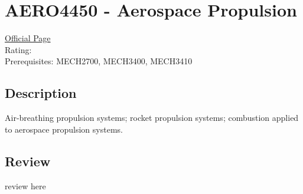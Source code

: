 \hypertarget{AERO4450}{\section{AERO4450 - Aerospace Propulsion}}

\large
\textcolor{turbo_purple}{\href{https://my.uq.edu.au/programs-courses/course.html?course_code=AERO4450}{Official Page}} \\
Rating: \cstar\cstar\cstar\cstar\ostar \\
Prerequisites: MECH2700, MECH3400, MECH3410

\normalsize
\subsection*{Description}
Air-breathing propulsion systems; rocket propulsion systems; combustion applied to aerospace propulsion systems.

\subsection*{Review}
review here
